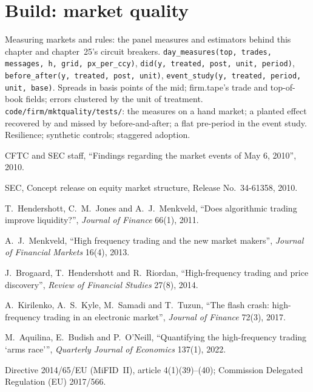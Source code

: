 \section{Build: market quality}\label{bld:mx:market-quality-and-regulation:mktquality}

\begin{build}
 Measuring markets and rules: the panel measures and estimators behind this chapter and chapter~25's circuit breakers.
 \texttt{day\_measures(top, trades, messages, h, grid, px\_per\_ccy)}, \texttt{did(y, treated, post, unit, period)},
\texttt{before\_after(y, treated, post, unit)}, \texttt{event\_study(y, treated, period, unit, base)}.
 Spreads in basis points of the mid; firm.tape's trade and top-of-book fields; errors clustered by the unit of treatment.
 \texttt{code/firm/mktquality/tests/}: the measures on a hand market; a planted effect recovered by 
and missed by before-and-after; a flat pre-period in the event study.
 Resilience; synthetic controls; staggered adoption.
\end{build}

\begin{omsources}
\item CFTC and SEC staff, ``Findings regarding the market events of May 6, 2010'', 2010.
\item SEC, Concept release on equity market structure, Release No.~34-61358, 2010.
\item T.~Hendershott, C.~M.~Jones and A.~J.~Menkveld, ``Does algorithmic trading improve liquidity?'', \emph{Journal of Finance} 66(1), 2011.
\item A.~J.~Menkveld, ``High frequency trading and the new market makers'', \emph{Journal of Financial Markets} 16(4), 2013.
\item J.~Brogaard, T.~Hendershott and R.~Riordan, ``High-frequency trading and price discovery'', \emph{Review of Financial Studies} 27(8), 2014.
\item A.~Kirilenko, A.~S.~Kyle, M.~Samadi and T.~Tuzun, ``The flash crash: high-frequency trading in an electronic market'', \emph{Journal of
Finance} 72(3), 2017.
\item M.~Aquilina, E.~Budish and P.~O'Neill, ``Quantifying the high-frequency trading `arms race''', \emph{Quarterly Journal of Economics} 137(1),
2022.
\item Directive 2014/65/EU (MiFID~II), article 4(1)(39)--(40); Commission Delegated Regulation (EU) 2017/566.
\end{omsources}


